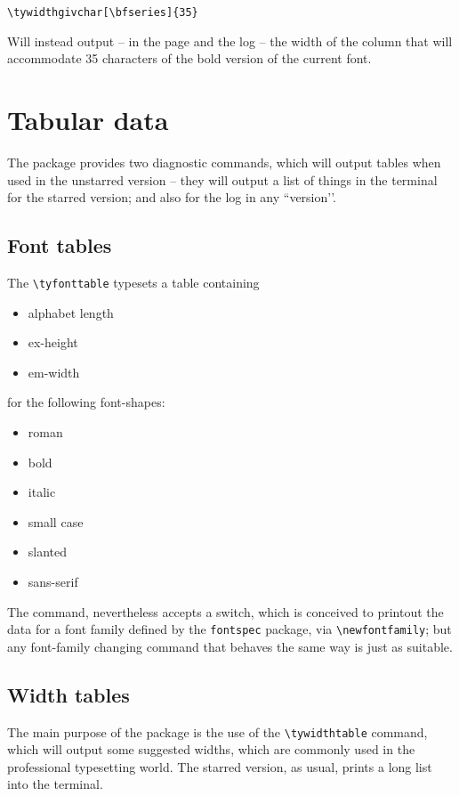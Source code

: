 \documentclass{article}
\makeatletter
\let\@@oldmpar\marginpar
\renewcommand{\marginpar}[1]{\@@oldmpar{\small#1}}
\makeatother
\begin{document}
\begin{verbatim}
\tywidthgivchar[\bfseries]{35}
\end{verbatim}
Will instead output -- in the page and the log -- the width of the column that will accommodate 35 characters of the bold version of the current font.
\section{Tabular data}
The package provides two diagnostic commands, which will output tables when used in the unstarred version -- they will output a list of things in the terminal for the starred version; and also for the log in any ``version’’.
\subsection{Font tables}
The \marginpar{\textbackslash tyfonttable} \verb|\tyfonttable| typesets a table containing
\begin{itemize}
\item alphabet length
\item ex-height
\item em-width
\end{itemize}
for the following font-shapes:
\begin{itemize}
\item roman
\item bold
\item italic
\item small case
\item slanted
\item sans-serif
\end{itemize}

The command, nevertheless accepts a switch, which is conceived to printout the data for a font family defined by the \texttt{fontspec} package, via \verb|\newfontfamily|; but any font-family changing command that behaves the same way is just as suitable.

\subsection{Width tables}\label{widthtables}
The main purpose of the package is the use of the \marginpar{\textbackslash tywidthtable}\verb!\tywidthtable! command, which will output some suggested widths, which are commonly used \cite{bib:bringhurst,bib:felici} in the professional typesetting world. The starred version, as usual, prints a long list into the terminal.
\end{document}
